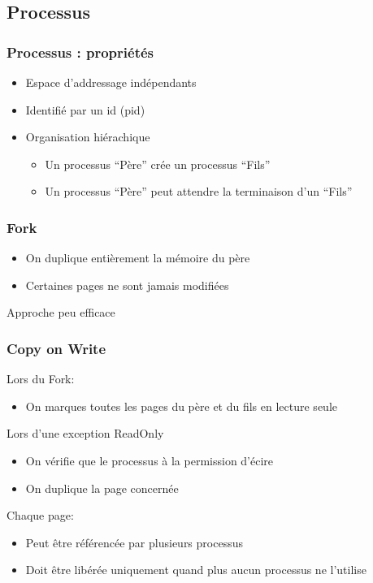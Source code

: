 \documentclass{beamer}
\begin{document}
\subsection{Processus}
\begin{frame}
  \frametitle{Processus : propriétés}
  \begin{itemize}
  \item Espace d'addressage indépendants
  \item Identifié par un id (pid)
  \item Organisation hiérachique
    \begin{itemize}
    \item Un processus ``Père'' crée un processus ``Fils''
    \item Un processus ``Père'' peut attendre la terminaison d'un ``Fils''
    \end{itemize}
  \end{itemize}
\end{frame}

\begin{frame}
  \frametitle{Fork}
  \begin{itemize}
  \item On duplique entièrement la mémoire du père
  \item Certaines pages ne sont jamais modifiées
  \end{itemize}
  Approche peu efficace
\end{frame}

\begin{frame}
  \frametitle{Copy on Write}
  Lors du Fork:
  \begin{itemize}
    \item On marques toutes les pages du père et du fils en lecture seule
  \end{itemize}

  Lors d'une exception ReadOnly
  \begin{itemize}
  \item On vérifie que le processus à la permission d'écire
  \item On duplique la page concernée
  \end{itemize}

  Chaque page:
  \begin{itemize}
  \item Peut être référencée par plusieurs processus
  \item Doit être libérée uniquement quand plus aucun processus ne l'utilise
  \end{itemize}
\end{frame}
\end{document}

